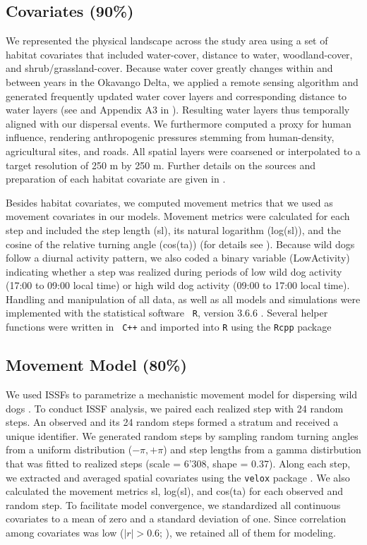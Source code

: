 \documentclass[abstract=on,10pt,a4paper,bibliography=totocnumbered]{article}
\begin{document}
\subsection{Covariates (90\%)}
We represented the physical landscape across the study area using a set of
habitat covariates that included water-cover, distance to water, woodland-cover,
and shrub/grassland-cover. Because water cover greatly changes within and
between years in the Okavango Delta, we applied a remote sensing algorithm and
generated frequently updated water cover layers and corresponding distance to
water layers (see \citealp{Wolski.2017} and Appendix A3 in
\citealp{Hofmann.2021}). Resulting water layers thus temporally aligned with our
dispersal events. We furthermore computed a proxy for human influence, rendering
anthropogenic pressures stemming from human-density, agricultural sites, and
roads. All spatial layers were coarsened or interpolated to a target resolution
of 250 m by 250 m. Further details on the sources and preparation of each
habitat covariate are given in \cite{Hofmann.2021}.

Besides habitat covariates, we computed movement metrics that we used as
movement covariates in our models. Movement metrics were calculated for each
step and included the step length (\textsf{sl}), its natural logarithm
(\textsf{log(sl)}), and the cosine of the relative turning angle
(\textsf{cos(ta)}) (for details see \citep{Avgar.2016, Fieberg.2020}). Because
wild dogs follow a diurnal activity pattern, we also coded a binary variable
(\textsf{LowActivity}) indicating whether a step was realized during periods of
low wild dog activity (17:00 to 09:00 local time) or high wild dog activity
(09:00 to 17:00 local time). Handling and manipulation of all data, as well as
all models and simulations were implemented with the statistical software {\tt
R}, version 3.6.6 \citep{R.2019}. Several helper functions were written in {\tt
C++} and imported into {\tt R} using the {\tt Rcpp} package
\citep{Eddelbuettel.2011, Eddelbuettel.2013}

\subsection{Movement Model (80\%)}
We used ISSFs to parametrize a mechanistic movement model for dispersing wild
dogs \citep{Avgar.2016}. To conduct ISSF analysis, we paired each realized step
with 24 random steps. An observed and its 24 random steps formed a stratum and
received a unique identifier. We generated random steps by sampling random
turning angles from a uniform distribution (\(-\pi, +\pi\)) and step lengths
from a gamma distirbution that was fitted to realized steps (scale = 6'308,
shape = 0.37). Along each step, we extracted and averaged spatial covariates
using the {\tt velox} package \citep{Hunziker.2017}. We also calculated the
movement metrics \textsf{sl}, \textsf{log(sl)}, and \textsf{cos(ta)} for each
observed and random step. To facilitate model convergence, we standardized all
continuous covariates to a mean of zero and a standard deviation of one. Since
correlation among covariates was low (\(|r| > 0.6\); \citealp{Latham.2011}), we
retained all of them for modeling.
\end{document}
